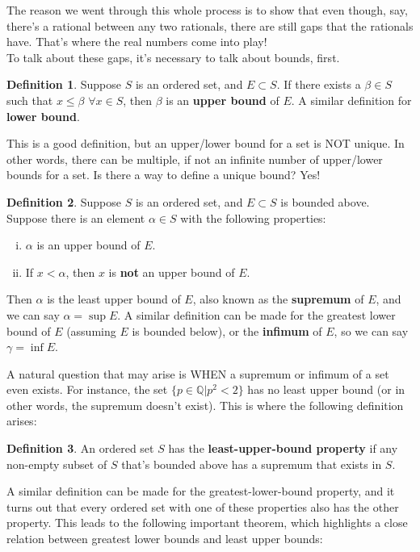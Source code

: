 \documentclass{article}
\theoremstyle{definition}
\newtheorem{definition}{Definition}[section]
\begin{document}
\begin{section}
\noindent The reason we went through this whole process is to show that even though, say, there's a rational between any two rationals, there are still gaps that the rationals have. That's where the real numbers come into play! \\
To talk about these gaps, it's necessary to talk about bounds, first. 

\begin{definition}
Suppose $S$ is an ordered set, and $E \subset S$. If there exists a $\beta \in S$ such that $x \leq \beta$ $\forall x \in S$, then $\beta$ is an \textbf{upper bound} of $E$. A similar definition for \textbf{lower bound}.
\end{definition}

\noindent This is a good definition, but an upper/lower bound for a set is NOT unique. In other words, there can be multiple, if not an infinite number of upper/lower bounds for a set. Is there a way to define a unique bound? Yes!
\begin{definition}
Suppose $S$ is an ordered set, and $E \subset S$ is bounded above. Suppose there is an element $\alpha \in S$ with the following properties:
\begin{enumerate}[(i)]
\item $\alpha$ is an upper bound of $E$.
\item If $x < \alpha$, then $x$ is \textbf{not} an upper bound of $E$.
\end{enumerate}
Then $\alpha$ is the least upper bound of $E$, also known as the \textbf{supremum} of $E$, and we can say $\alpha = \sup E$. \newline
A similar definition can be made for the greatest lower bound of $E$ (assuming $E$ is bounded below), or the \textbf{infimum} of $E$, so we can say $\gamma = \inf E$.
\end{definition} 
\noindent A natural question that may arise is WHEN a supremum or infimum of a set even exists. For instance, the set $\{p \in \mathbb{Q}  \mathrel{} | \mathrel{} p^2 < 2 \} $ has no least upper bound (or in other words, the supremum doesn't exist). This is where the following definition arises:
\begin{definition}
An ordered set $S$ has the \textbf{least-upper-bound property} if any non-empty subset of $S$ that's bounded above has a supremum that exists in $S$.
\end{definition}

\noindent A similar definition can be made for the greatest-lower-bound property, and it turns out that every ordered set with one of these properties also has the other property. This leads to the following important theorem, which highlights a close relation between greatest lower bounds and least upper bounds:


\end{section}
\end{document}
